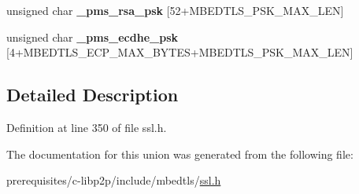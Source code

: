 \begin{DoxyCompactItemize}
\mbox{\label{unionmbedtls__ssl__premaster__secret_a6f84cacb8dfa3313b0fab5c72055c5e1}} 
unsigned char {\bfseries \+\_\+pms\+\_\+rsa\+\_\+psk} \mbox{[}52+M\+B\+E\+D\+T\+L\+S\+\_\+\+P\+S\+K\+\_\+\+M\+A\+X\+\_\+\+L\+EN\mbox{]}
\item 
\mbox{\label{unionmbedtls__ssl__premaster__secret_a118de301deea6334c6ddc5338e828251}} 
unsigned char {\bfseries \+\_\+pms\+\_\+ecdhe\+\_\+psk} \mbox{[}4+M\+B\+E\+D\+T\+L\+S\+\_\+\+E\+C\+P\+\_\+\+M\+A\+X\+\_\+\+B\+Y\+T\+ES+M\+B\+E\+D\+T\+L\+S\+\_\+\+P\+S\+K\+\_\+\+M\+A\+X\+\_\+\+L\+EN\mbox{]}
\end{DoxyCompactItemize}


\subsection{Detailed Description}


Definition at line 350 of file ssl.\+h.



The documentation for this union was generated from the following file\+:\begin{DoxyCompactItemize}
\item 
prerequisites/c-\/libp2p/include/mbedtls/\mbox{\hyperlink{ssl_8h}{ssl.\+h}}\end{DoxyCompactItemize}
